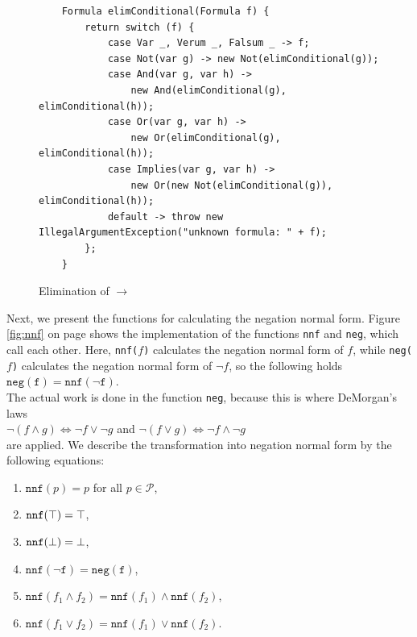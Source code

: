 \begin{figure}[!ht]
  \centering
\begin{verbatim}
    Formula elimConditional(Formula f) {
        return switch (f) {
            case Var _, Verum _, Falsum _ -> f;
            case Not(var g) -> new Not(elimConditional(g));
            case And(var g, var h) ->
                new And(elimConditional(g), elimConditional(h));
            case Or(var g, var h) ->
                new Or(elimConditional(g), elimConditional(h));
            case Implies(var g, var h) ->
                new Or(new Not(elimConditional(g)), elimConditional(h));
            default -> throw new IllegalArgumentException("unknown formula: " + f);
        };
    }
\end{verbatim}
\vspace*{-0.3cm}
  \caption{Elimination of $\rightarrow$}
  \label{fig:eliminate-folgt}
\end{figure}
\pagebreak
Next, we present the functions for calculating the negation normal form.
Figure
\ref{fig:nnf} on page \pageref{fig:nnf} shows the implementation of the functions
\texttt{nnf} and \texttt{neg},
which call each other.  Here, \texttt{nnf($f$)} calculates the negation normal form of $f$, while  
\texttt{neg($f$)} calculates the negation normal form of $\neg f$, so the following holds
\\[0.2cm]
\hspace*{1.3cm}
$\texttt{neg}(\texttt{f}) = \texttt{nnf}(\neg \texttt{f})$.
\\[0.2cm]
 The actual work is done in the
function \texttt{neg}, because this is where DeMorgan's laws 
\\[0.2cm]
\hspace*{1.3cm}
$\neg (f \wedge g) \Leftrightarrow \neg f \vee \neg g$ \quad and \quad 
$\neg (f \vee g) \Leftrightarrow \neg f \wedge \neg g$ 
\\[0.2cm]
are applied.  We describe the transformation into negation normal form by 
the following equations: 
\begin{enumerate}
\item $\texttt{nnf}(p) = p$ \quad for all $p \in \mathcal{P}$,
\item $\texttt{nnf}(\top) = \top$,
\item $\texttt{nnf}(\bot) = \bot$,
\item $\texttt{nnf}(\neg \texttt{f}) = \texttt{neg}(\texttt{f})$,
\item $\texttt{nnf}(f_1 \wedge f_2) = \texttt{nnf}(f_1) \wedge \texttt{nnf}(f_2)$,
\item $\texttt{nnf}(f_1 \vee f_2) = \texttt{nnf}(f_1) \vee \texttt{nnf}(f_2)$.
\end{enumerate}

